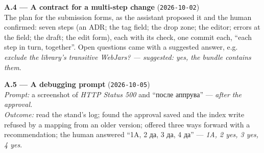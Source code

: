 \documentclass[11pt]{article}
\newcommand{\ru}[1]{{\cyrfont #1}}
\begin{document}
\textbf{A.4 --- A contract for a multi-step change} (\texttt{2026-10-02})\\
The plan for the submission forms, as the assistant proposed it and the human confirmed: seven steps
(an ADR; the tag field; the drop zone; the editor; errors at the field; the draft; the edit form),
each with its check, one commit each, ``each step in turn, together''. Open questions came with a
suggested answer, e.g. \emph{exclude the library's transitive WebJars? --- suggested: yes, the
bundle contains them}.

\textbf{A.5 --- A debugging prompt} (\texttt{2026-10-05})\\
\emph{Prompt:} a screenshot of \emph{HTTP Status 500} and ``\ru{после аппрува}'' --- \emph{after the
approval.}\\
\emph{Outcome:} read the stand's log; found the approval saved and the index write refused by a
mapping from an older version; offered three ways forward with a recommendation; the human answered
``\ru{1A, 2 да, 3 да, 4 да}'' --- \emph{1A, 2 yes, 3 yes, 4 yes}.
\end{document}
